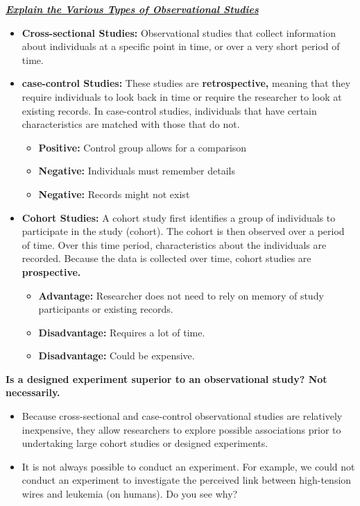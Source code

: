 \documentclass{report}
\begin{document}
        \bigbreak \noindent \bigbreak \noindent 
        \textbf{\textit{\underline{Explain the Various Types of Observational Studies}}}
        \bigbreak \noindent 
        \begin{itemize}
            \item \textbf{Cross-sectional Studies:} Observational studies that collect information about individuals at a specific point in time, or over a very short period of time.
            \item \textbf{case-control Studies:} These studies are \textbf{retrospective,} meaning that they require individuals to look back in time or require the researcher to look at existing records. In case-control studies, individuals that have certain characteristics are matched with those that do not.
                \begin{itemize}
                    \item \textbf{Positive:} Control group allows for a comparison
                    \item \textbf{Negative:} Individuals must remember details
                    \item \textbf{Negative:} Records might not exist
                \end{itemize}
            \item \textbf{Cohort Studies:} A cohort study first identifies a group of individuals to participate in the study (cohort). The cohort is then observed over a period of time. Over this time period, characteristics about the individuals are recorded. Because the data is collected over time, cohort studies are \textbf{prospective.}
                \begin{itemize}
                    \item \textbf{Advantage:} Researcher does not need to rely on memory of study participants or existing records.
                    \item \textbf{Disadvantage:} Requires a lot of time.
                    \item \textbf{Disadvantage:} Could be expensive.
                \end{itemize}
        \end{itemize}

        \pagebreak \bigbreak \noindent
        \textbf{Is a designed experiment superior to an observational study? Not necessarily.}
        \begin{itemize}
            \item Because cross-sectional and case-control observational studies are relatively inexpensive, they allow researchers to explore possible associations prior to undertaking large cohort studies or designed experiments.
            \item It is not always possible to conduct an experiment. For example, we could not conduct an experiment to investigate the perceived link between high-tension wires and leukemia (on humans). Do you see why?
        \end{itemize}
\end{document}
